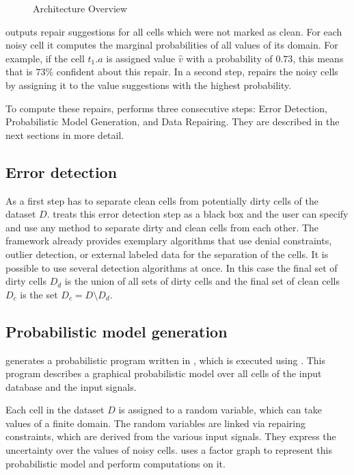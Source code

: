   \begin{figure}
    \centering
    
    \caption{\holoclean{} Architecture Overview}
    \label{fig:architecture}
  \end{figure}

  \holoclean{} outputs repair suggestions for all cells which were not marked as clean.
  For each noisy cell it computes the marginal probabilities of all values of its domain.
  For example, if the cell $t_1.a$ is assigned value $\hat{v}$ with a probability of $0.73$, this means that \holoclean{} is $73\%$ confident about this repair.
  In a second step, \holoclean{} repairs the noisy cells by assigning it to the value suggestions with the highest probability.
  
  To compute these repairs, \holoclean{} performs three consecutive steps: \textsf{Error Detection}, \textsf{Probabilistic Model Generation}, and \textsf{Data Repairing}.
  They are described in the next sections in more detail.
 
  \subsection{Error detection}\label{sec:error_detection}
  As a first step \holoclean{} has to separate clean cells from potentially dirty cells of the dataset $D$.
  \holoclean{} treats this error detection step as a black box and the user can specify and use any method to separate dirty and clean cells from each other.
  The framework already provides exemplary algorithms that use denial constraints, outlier detection, or external labeled data for the separation of the cells.
  It is possible to use several detection algorithms at once.
  In this case the final set of dirty cells $D_d$ is the union of all sets of dirty cells and the final set of clean cells $D_c$ is the set $D_c = D \setminus D_d$.

  \subsection{Probabilistic model generation}\label{sec:model_generation}
  \holoclean{} generates a probabilistic program written in \ddlog{}, which is executed using \deepdive{}.
  This program describes a graphical probabilistic model over all cells of the input database and the input signals.
  
  Each cell in the dataset $D$ is assigned to a random variable, which can take values of a finite domain.
  The random variables are linked via repairing constraints, which are derived from the various input signals.
  They express the uncertainty over the values of noisy cells.
  \holoclean{} uses a factor graph to represent this probabilistic model and perform computations on it.
  
